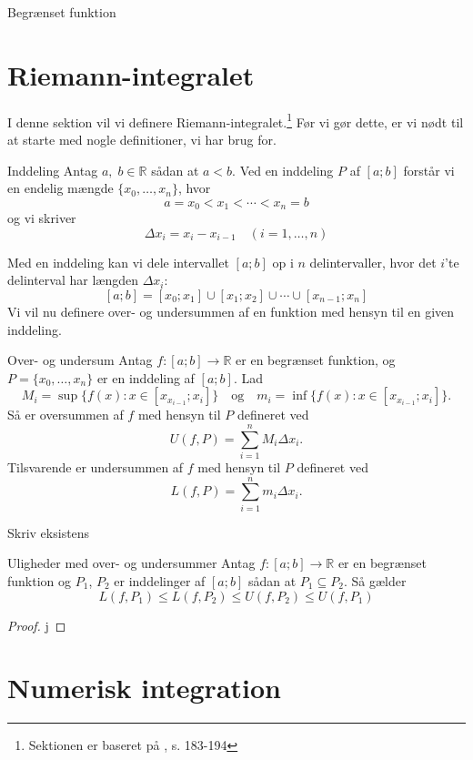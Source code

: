\documentclass{article}
\begin{document}
\begin{definition}{Begrænset funktion}{}
  
\end{definition}
\section{Riemann-integralet}%
\label{sec:Riemann-integralet}
I denne sektion vil vi definere Riemann-integralet.\footnote{Sektionen er baseret på \cite{Abbott2002}, s. 183-194}
Før vi gør dette, er vi nødt til at starte med nogle definitioner, vi har brug for.
\begin{definition}{Inddeling}{}
  Antag $a,\;b \in \mathbb{R}$ sådan at $a <b$.
  Ved en inddeling $P$ af $[a;b]$ forstår vi en endelig mængde $\{x_0,\dotsc, x_n\}$, hvor
  \[
  a=x_0<x_1<\cdots<x_n=b
  \] 
  og vi skriver 
  \[
  \Delta x_i=x_i-x_{i-1} \quad (i=1,\ldots ,n)
  \]  
\end{definition}
Med en inddeling kan vi dele intervallet $[a;b]$ op i $n$ delintervaller, hvor det $i$'te delinterval har længden $\Delta x_i$:
\[
[a;b]=[x_0;x_1] \cup [x_1;x_2]\cup \cdots \cup [x _{n-1};x_n]
\] 
Vi vil nu definere over- og undersummen af en funktion med hensyn til en given inddeling.

\begin{definition}{Over- og undersum}{}
  Antag $f:[a;b] \to \mathbb{R}$ er en begrænset funktion, og $P=\{x_0,\ldots, x_n\}$ er en inddeling af $[a;b]$. 
  Lad 
  \[
  M_i=\sup \{ f(x):x \in [x _{x_{i-1}};x_i] \} \quad{\text{og}} \quad m_i=\inf \{ f(x):x \in [x _{x_{i-1}};x_i] \}.
  \] 
  Så er oversummen af $f$ med hensyn til $P$ defineret ved
  \[
  U(f,P)=\sum_{i=1}^{n} M_i \Delta x_i.
  \] 
  Tilsvarende er undersummen af $f$ med hensyn til $P$ defineret ved
  \[
  L(f,P)=\sum_{i=1}^{n} m_i \Delta x_i.
  \] 
\end{definition}
Skriv eksistens

\begin{theorem}{Uligheder med over- og undersummer}{}
  Antag $f:[a;b] \to \mathbb{R}$ er en begrænset funktion og $P_1$, $P_2$ er inddelinger af $[a;b]$ sådan at $P_1 \subseteq P_2$. Så gælder
  \[
  L(f,P_1)\leq L(f,P_2) \leq U(f,P_2) \leq U(f,P_1)
  \] 
\end{theorem}
\begin{proof} 
  j
\end{proof}

\section{Numerisk integration}%
\label{sec:Numerisk integration}



\newpage
\singlespacing %
\setlength{\bibsep}{5pt} %
\thispagestyle{empty} %
\end{document}
